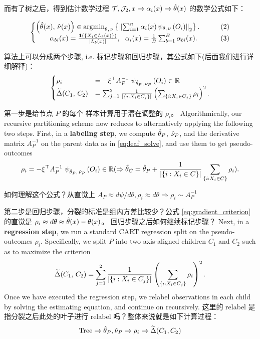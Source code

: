 \documentclass[aos]{imsart}
\theoremstyle{plain}
\theoremstyle{definition}
\theoremstyle{remark}
\begin{document}
\begin{CJK}{UTF8}{gbsn}
而有了树之后，得到估计数学过程 $\mathcal{T}, \mathcal{J}_2, x \to \alpha_i(x) \to \hat{\theta}(x)$ 的数学公式如下：

\begin{equation*}
\begin{cases}
\p{\htheta(x), \, \hnu(x)} \in \argmin_{\theta, \, \nu} \cb{\Norm{\sum_{i = 1}^n \alpha_i(x) \, \psi_{\theta, \, \nu}\p{O_i}}_2}. &\qquad (2) \\
\qquad  \alpha_{bi}(x) = \frac{\1\p{\cb{X_i \in L_b(x)}}}{\abs{L_b(x)}}, \ \ \alpha_i(x) = \frac{1}{B} \sum_{b = 1}^B \alpha_{bi}(x).  &\qquad (3) \\
\end{cases}
\end{equation*}


算法上可以分成两个步骤, i.e. 标记步骤和回归步骤，其公式如下(后面我们进行详细解释)：
$$
\begin{cases}
\rho_i &= -\xi^\top A_P^{-1} \ \psi_{\htheta_P, \, \hnu_P}\p{O_i} \in \RR  \\
\tDelta(C_1, \, C_2) &=  \sum_{j = 1}^2\frac{1}{\abs{\cb{i : X_i \in C_j}}}\p{ \sum_{\cb{i : X_i \in C_j}} \rho_i}^2.
\end{cases}
$$


第一步是给节点 $P$ 的每个 样本计算用于潜在调整的 $\rho_i$。 Algorithmically, our recursive partitioning scheme now reduces to alternatively
applying the following two steps. First, in a {\bf labeling step}, we compute
$\hat{\theta}_P$, $\hat{\nu}_P$, and the derivative matrix $A_P^{-1}$ on the parent
data as in \eqref{eq:leaf_solve}, and use them to get pseudo-outcomes
\begin{equation}
\label{eq:relabel}
\rho_i = -\xi^\top A_P^{-1} \ \psi_{\htheta_P, \, \hnu_P}\p{O_i} \in \RR (\Rightarrow \ttheta_C = \htheta_P + \frac{1}{\abs{\cb{i : X_i \in C}}} \sum_{\cb{i : X_i \in C}} \rho_i).
\end{equation}


如何理解这个公式？从直觉上 $A_P \approx d\psi/ d\theta, \rho_i \approx d\theta \Rightarrow \rho_i \sim A_P^{-1}$


第二步是回归步骤，分裂的标准是组内方差比较少？公式 \eqref{eq:gradient_criterion} 的直觉是 $\rho_i \approx d\theta \approx \hat{\theta}(x) - \theta(x)$。 回归步骤之后如何继续标记步骤？ Next, in a {\bf regression step}, we run a standard CART regression split on the pseudo-outcomes
$\rho_i$. Specifically, we split $P$ into two axis-aligned children $C_1$ and $C_2$
such as to maximize the criterion
\begin{equation}
\label{eq:gradient_criterion}
\tDelta(C_1, \, C_2) =  \sum_{j = 1}^2\frac{1}{\abs{\cb{i : X_i \in C_j}}}\p{ \sum_{\cb{i : X_i \in C_j}} \rho_i}^2.
\end{equation}
Once we have executed the regression step, we relabel observations in each child by solving the
estimating equation, and continue on recursively. 这里的 relabel 是指分裂之后此处的叶子进行 relabel 吗？整体来说就是如下计算过程：
$$
\text{Tree} \to \hat{\theta}_P, \hat{\nu}_P \to \rho_i \to \widetilde{\Delta}(C_1, C_2)
$$


\end{CJK}
\end{document}
